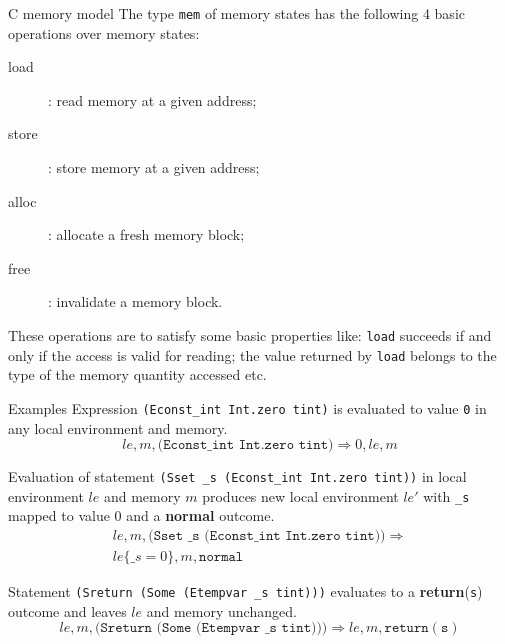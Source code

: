 \documentclass[10pt,usenames,dvipsnames,landscape]{beamer}
\begin{document}
\begin{frame}{C memory model}
  The type \texttt{mem} of memory states has  the following 4 basic operations over memory states:
  \bigskip
\begin{description}
\item [load]: read memory at a given address;
\item [store]: store memory at a given address;
\item [alloc]: allocate a fresh memory block;
\item [free]: invalidate a memory block.
\end{description}
These operations are to satisfy some basic properties like:  \texttt{load} succeeds if and only if the access is valid for reading; the value returned by \texttt{load} belongs to the type of the memory quantity accessed etc. 

\end{frame}

\begin{frame}{Examples}
     Expression  \texttt{(Econst\_int Int.zero tint)}   is evaluated to value \texttt{0} in any local environment and memory. 
      \[ le, m , \texttt{(Econst\_int Int.zero tint)} \Rightarrow 0, le, m \]

   Evaluation of statement \texttt{(Sset \_s (Econst\_int Int.zero tint))} in local environment $le$ and memory $m$ produces new local environment $le'$ with \texttt{\_s} mapped to value $0$ and a {\bf normal} outcome. 
   \[ 
   \begin{split}
le, m, \texttt{(Sset \_s (Econst\_int Int.zero tint))} \Rightarrow \\ le\{\_s = 0\}, m, \texttt{normal} 
\end{split}
\]

   Statement \texttt{(Sreturn (Some (Etempvar \_s tint)))} evaluates to a {\bf return}(\texttt{s}) outcome and leaves $le$ and memory unchanged.
     \[ le, m,\texttt{(Sreturn (Some (Etempvar \_s tint)))}  \Rightarrow le, m, \texttt{return}(\texttt{s}) \]
    

\end{frame}
\end{document}

